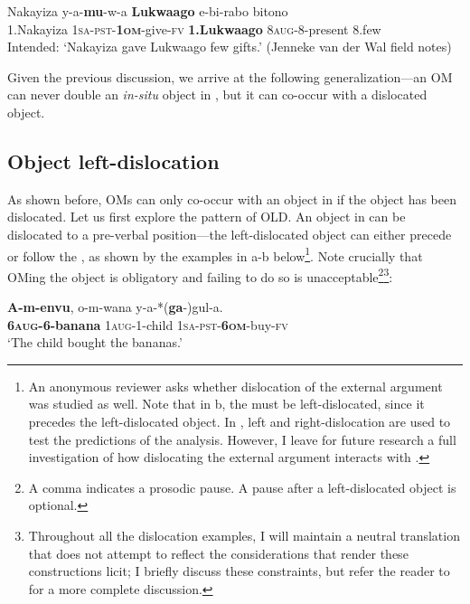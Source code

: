 \documentclass[output=paper
,newtxmath
,modfonts
,nonflat]{langsci/langscibook}
\begin{document}
\ea\label{ex:ranero:13}
\gll *Nakayiza  y-a-\textbf{mu}{}-w-a                   \textbf{Lukwaago}    e-bi-rabo            bitono\\
1.Nakayiza \textsc{1sa-pst-}\textbf{\textsc{1om}}{}-give-\textsc{fv} \textbf{1.Lukwaago} 8\textsc{aug}{}-8-present 8.few\\
\glt Intended: ‘Nakayiza gave Lukwaago few gifts.’ (Jenneke van der Wal field notes)
\z

Given the previous discussion, we arrive at the following generalization—an OM can never double an \textit{in-situ} object in , but it can co-occur with a dislocated object.

\subsection{Object left-dislocation}\label{sec:ranero:3.2}

As shown before, OMs can only co-occur with an object in  if the object has been dislocated. Let us first explore the pattern of OLD. An object in  can be dislocated to a pre-verbal position—the left-dislocated object can either precede or follow the , as shown by the examples in a-b below\footnote{An anonymous reviewer asks whether dislocation of the external argument was studied as well. Note that in b, the  must be left-dislocated, since it precedes the left-dislocated object. In ,  left and right-dislocation are used to test the predictions of the analysis. However, I leave for future research a full investigation of how dislocating the external argument interacts with .}. Note crucially that OMing the object is obligatory and failing to do so is unacceptable\footnote{A comma indicates a prosodic pause. A pause after a left-dislocated object is optional.}\footnote{Throughout all the dislocation examples, I will maintain a neutral translation that does not attempt to reflect the  considerations that render these constructions licit; I briefly discuss these  constraints, but refer the reader to \citet{ranero2015} for a more complete discussion.}:

\ea\label{ex:ranero:14}
\ea\label{ex:ranero:14a}
\gll \textbf{A-m-envu},         o-m-wana       y-a-*(\textbf{ga}{}-)gul-a.\\
\textbf{6\textsc{aug}}\textbf{{}-6-banana} 1\textsc{aug}{}-1-child \textsc{1sa-pst-}\textbf{\textsc{6om}}{}-buy-\textsc{fv}\\
\glt ‘The child bought the bananas.’
\end{document}
